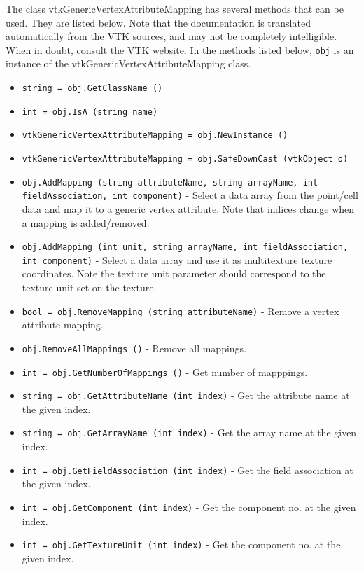 The class vtkGenericVertexAttributeMapping has several methods that can be used.
  They are listed below.
Note that the documentation is translated automatically from the VTK sources,
and may not be completely intelligible.  When in doubt, consult the VTK website.
In the methods listed below, \verb|obj| is an instance of the vtkGenericVertexAttributeMapping class.
\begin{itemize}
\item  \verb|string = obj.GetClassName ()|

\item  \verb|int = obj.IsA (string name)|

\item  \verb|vtkGenericVertexAttributeMapping = obj.NewInstance ()|

\item  \verb|vtkGenericVertexAttributeMapping = obj.SafeDownCast (vtkObject o)|

\item  \verb|obj.AddMapping (string attributeName, string arrayName, int fieldAssociation, int component)| -  Select a data array from the point/cell data
 and map it to a generic vertex attribute.
 Note that indices change when a mapping is added/removed.

\item  \verb|obj.AddMapping (int unit, string arrayName, int fieldAssociation, int component)| -  Select a data array and use it as multitexture texture
 coordinates.
 Note the texture unit parameter should correspond to the texture
 unit set on the texture.

\item  \verb|bool = obj.RemoveMapping (string attributeName)| -  Remove a vertex attribute mapping.

\item  \verb|obj.RemoveAllMappings ()| -  Remove all mappings.

\item  \verb|int = obj.GetNumberOfMappings ()| -  Get number of mapppings.

\item  \verb|string = obj.GetAttributeName (int index)| -  Get the attribute name at the given index.

\item  \verb|string = obj.GetArrayName (int index)| -  Get the array name at the given index.

\item  \verb|int = obj.GetFieldAssociation (int index)| -  Get the field association at the given index.

\item  \verb|int = obj.GetComponent (int index)| -  Get the component no. at the given index.

\item  \verb|int = obj.GetTextureUnit (int index)| -  Get the component no. at the given index.

\end{itemize}
